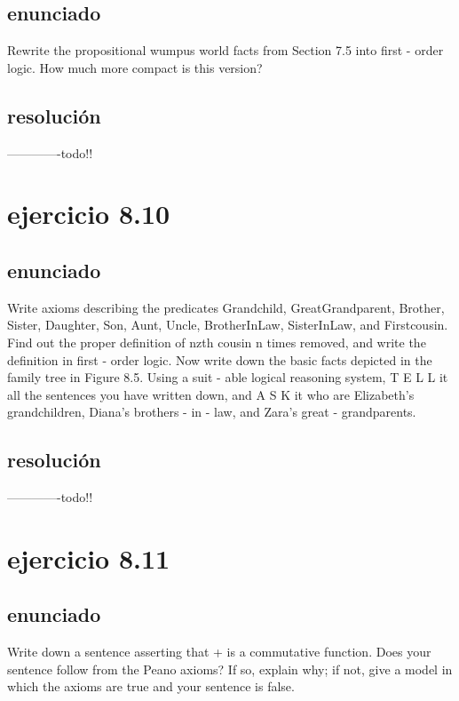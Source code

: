 \documentclass[a4paper,10pt]{article}
\begin{document}
\subsection{enunciado}
Rewrite the propositional wumpus world facts from Section 7.5 into first - order logic. How much more compact is this version?
\subsection{resolución}
-------------todo!!

\section{ejercicio 8.10}
\subsection{enunciado}
Write axioms  describing  the  predicates Grandchild, GreatGrandparent, Brother, Sister, Daughter, Son,  Aunt, Uncle, BrotherInLaw, SisterInLaw, and Firstcousin. Find  out  the  proper  definition of nzth cousin n times  removed,  and  write  the  definition in first - order logic. Now write down the basic facts depicted in the family tree in Figure 8.5. Using a suit - able logical  reasoning  system, T E L L it all the  sentences you have written down,  and A S K it who are Elizabeth's  grandchildren, Diana's  brothers - in - law, and Zara's  great - grandparents.
\subsection{resolución}
-------------todo!!

\section{ejercicio 8.11}
\subsection{enunciado}
Write down a sentence asserting that + is a commutative function. Does your sentence follow from the Peano axioms? If so, explain why; if not, give a model in which the axioms are true and your sentence is false.
\end{document}
